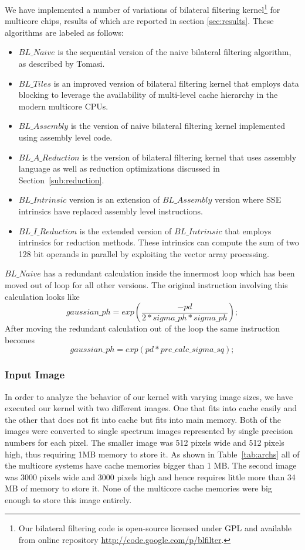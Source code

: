 \documentclass{IEEEtran}
\begin{document}
We have implemented a number of variations of bilateral filtering kernel\footnote[2]{Our bilateral filtering code is open-source licensed under GPL and available from online repository \url{http://code.google.com/p/blfilter}.}  for multicore chips, results of which are reported in section \ref{sec:results}. These algorithms are labeled as follows: 
\begin{itemize}
\item $BL\_Naive$ is the sequential version of the naive bilateral filtering algorithm, as described by Tomasi\cite{Tomasi1998}. 
\item $BL\_Tiles$ is an improved version of bilateral filtering kernel that employs data blocking to leverage the availability of multi-level cache hierarchy in the modern multicore CPUs. 
\item $BL\_Assembly$ is the version of naive bilateral filtering kernel implemented using assembly level code. 
\item $BL\_A\_Reduction$ is the version of bilateral filtering kernel that uses assembly language as well as reduction optimizations discussed in Section~\ref{sub:reduction}.
\item $BL\_Intrinsic$ version is an extension of $BL\_Assembly$ version where SSE intrinsics have replaced assembly level instructions.
\item $BL\_I\_Reduction$ is the extended version of $BL\_Intrinsic$ that employs intrinsics for reduction methods. These intrinsics can compute the sum of two 128 bit operands in parallel by exploiting the vector array processing. 
\end{itemize}
$BL\_Naive$ has a redundant calculation inside the innermost loop which has been moved out of loop for all other versions. The original instruction involving this calculation looks like
 $$gaussian\_ph = exp\left( \frac{-pd} {2 * sigma\_ph*sigma\_ph}\right);$$
After moving the redundant calculation out of the loop the same instruction becomes
 $$gaussian\_ph = exp( pd * pre\_calc\_sigma\_sq );$$ 
 
\subsubsection{Input Image}
In order to analyze the behavior of our kernel with varying image sizes, we have executed our kernel with two different images. One that fits into cache easily and the other that does not fit into cache but fits into main memory. Both of the images were converted to single spectrum images represented by single precision numbers for each pixel. The smaller image was 512 pixels wide and 512 pixels high, thus requiring 1MB memory to store it. As shown in Table~\ref{tab:archs} all of the multicore systems have cache memories bigger than 1 MB. The second image was 3000 pixels wide and 3000 pixels high and hence requires little more than 34 MB of memory to store it. None of the multicore cache memories were big enough to store this image entirely.
\end{document}
